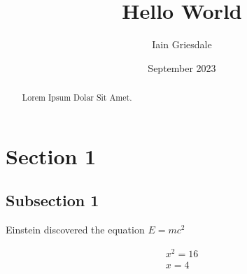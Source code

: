 \documentclass[titlepage]{article}
\title{Hello World}
\author{Iain Griesdale}
\date{September 2023}
\begin{document}
\maketitle

\begin{abstract}
    Lorem Ipsum Dolar Sit Amet.
\end{abstract}

\section{Section 1}

\subsection{Subsection 1}

Einstein discovered the equation $E=mc^2$

\begin{equation} \label{eq1}
    \begin{split}
        x^2=16 \\
        x=4
    \end{split}
    
\end{equation}
\end{document}

